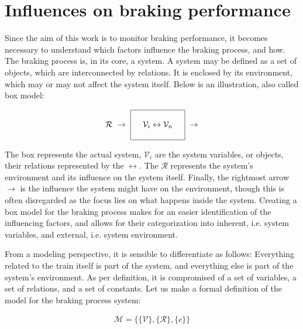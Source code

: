 \section{Influences on braking performance}
\label{sec:InfluencesOnBraking}
\par\noindent
Since the aim of this work is to monitor braking performance, it becomes necessary to understand which factors influence the braking process, and how. The braking process is, in its core, a system. A system may be defined as a set of objects, which are interconnected by relations. It is enclosed by its environment, which may or may not affect the system itself. Below is an illustration, also called box model:

\begin{align*}
	\displaystyle {\mathcal {R}}\ 
	\rightarrow \ 
	{\begin{array}{|c|}\hline \quad \\\quad {\mathcal {V}}_{i}\leftrightarrow {\mathcal {V}}_{n}\quad \\\quad \\\hline \end{array}}\ 
	\rightarrow
\end{align*}

\par\noindent
The box represents the actual system, ${\mathcal{V}}_{i}$ are the system variables, or objects, their relations represented by the $\leftrightarrow$. The ${\mathcal{R}}$ represents the system's environment and its influence on the system itself. Finally, the rightmost arrow $\rightarrow$ is the influence the system might have on the environment, though this is often disregarded as the focus lies on what happens inside the system. Creating a box model for the braking process makes for an easier identification of the influencing factors, and allows for their categorization into inherent, i.e. system variables, and external, i.e. system environment.
\par
From a modeling perspective, it is sensible to differentiate as follows: Everything related to the train itself is part of the system, and everything else is part of the system's environment. As per definition, it is compromised of a set of variables, a set of relations, and a set of constants. Let us make a formal definition of the model for the braking process system:

\begin{align*}
{\mathcal {M}} = \{ \{{\mathcal {V}}\}, \{{\mathcal{R}}\}, \{c\} \}
\end{align*}

